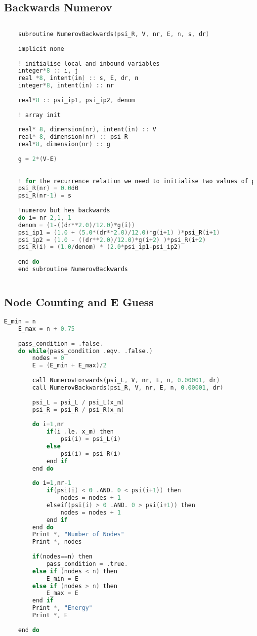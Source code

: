 \documentclass{article}
\begin{document}
    \subsection{Backwards Numerov}
    \begin{lstlisting}[language=C, label=Backwards]
    	
    subroutine NumerovBackwards(psi_R, V, nr, E, n, s, dr)
    
    implicit none
    
    ! initialise local and inbound variables
    integer*8 :: i, j
    real *8, intent(in) :: s, E, dr, n
    integer*8, intent(in) :: nr
    
    real*8 :: psi_ip1, psi_ip2, denom
    
    ! array init
    
    real* 8, dimension(nr), intent(in) :: V
    real* 8, dimension(nr) :: psi_R
    real*8, dimension(nr) :: g
    
    g = 2*(V-E)
    
    
    ! for the recurrence relation we need to initialise two values of psi
    psi_R(nr) = 0.0d0
    psi_R(nr-1) = s
    
    !numerov but hes backwards
    do i= nr-2,1,-1
    denom = (1-((dr**2.0)/12.0)*g(i))
    psi_ip1 = (1.0 + (5.0*(dr**2.0)/12.0)*g(i+1) )*psi_R(i+1)
    psi_ip2 = (1.0 - ((dr**2.0)/12.0)*g(i+2) )*psi_R(i+2)
    psi_R(i) = (1.0/denom) * (2.0*psi_ip1-psi_ip2)
    
    end do
    end subroutine NumerovBackwards
    	
    \end{lstlisting}
    
    \subsection{Node Counting and E Guess}
    \begin{lstlisting}[language=C, label=GuessE]
    E_min = n
    E_max = n + 0.75
    
    pass_condition = .false.
    do while(pass_condition .eqv. .false.)
	    nodes = 0
	    E = (E_min + E_max)/2
	    
	    call NumerovForwards(psi_L, V, nr, E, n, 0.00001, dr)
	    call NumerovBackwards(psi_R, V, nr, E, n, 0.00001, dr)
	    
	    psi_L = psi_L / psi_L(x_m)
	    psi_R = psi_R / psi_R(x_m)
	    
	    do i=1,nr
		    if(i .le. x_m) then
			    psi(i) = psi_L(i)
		    else
			    psi(i) = psi_R(i)
		    end if
    	end do
    	
    	do i=1,nr-1
	    	if(psi(i) < 0 .AND. 0 < psi(i+1)) then
		    	nodes = nodes + 1
	    	elseif(psi(i) > 0 .AND. 0 > psi(i+1)) then
		    	nodes = nodes + 1
	    	end if
    	end do
    	Print *, "Number of Nodes"
    	Print *, nodes
    	
    	if(nodes==n) then
	    	pass_condition = .true.
    	else if (nodes < n) then
	    	E_min = E
    	else if (nodes > n) then
	    	E_max = E
    	end if
    	Print *, "Energy"
    	Print *, E
    	
    end do
    	
    \end{lstlisting}
    
\end{document}
